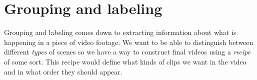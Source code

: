 %
\section{Grouping and labeling}
%
Grouping and labeling comes down to extracting information about what is happening in a piece of video footage. We want to be able to distinguish between different \textit{types} of scenes so we have a way to construct final videos using a \textit{recipe} of some sort. This recipe would define what kinds of clips we want in the video and in what order they should appear.
%
